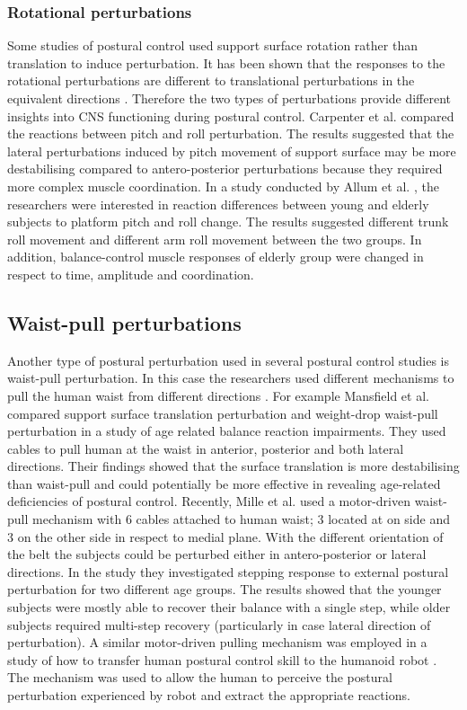 \documentclass[12pt,a4paper,twoside]{article}
\begin{document}
\subsubsection{{Rotational perturbations}}
Some studies of postural control used support surface rotation rather than translation to induce perturbation. It has been shown that the responses to the rotational perturbations are different to translational perturbations in the equivalent directions \cite{Nardone1990}. Therefore the two types of perturbations provide different insights into CNS functioning during postural control. Carpenter et al. \cite{Carpenter1999} compared the reactions between pitch and roll perturbation. The results suggested that the lateral perturbations induced by pitch movement of support surface may be more destabilising compared to antero-posterior perturbations because they required more complex muscle coordination. In a study conducted by Allum et al. \cite{Allum2002}, the researchers were interested in reaction differences between young and elderly subjects to platform pitch and roll change. The results suggested different trunk roll movement and different arm roll movement between the two groups. In addition, balance-control muscle responses of elderly group were changed in respect to time, amplitude and coordination.

\subsection{{Waist-pull perturbations}}
Another type of postural perturbation used in several postural control studies is waist-pull perturbation. In this case the researchers used different mechanisms to pull the human waist from different directions \cite{Luchies1994,Pidcoe1998}. For example Mansfield et al. \cite{Mansfield2009} compared support surface translation perturbation and weight-drop waist-pull perturbation in a study of age related balance reaction impairments. They used cables to pull human at the waist in anterior, posterior and both lateral directions. Their findings showed that the surface translation is more destabilising than waist-pull and could potentially be more effective in revealing age-related deficiencies of postural control. Recently, Mille et al. \cite{Mille2013a} used a motor-driven waist-pull mechanism with 6 cables attached to human waist; 3 located at on side and 3 on the other side in respect to medial plane. With the different orientation of the belt the subjects could be perturbed either in antero-posterior or lateral directions. In the study they investigated stepping response to external postural perturbation for two different age groups. The results showed that the younger subjects were mostly able to recover their balance with a single step, while older subjects required multi-step recovery (particularly in case lateral direction of perturbation). A similar motor-driven pulling mechanism \cite{Peternel2013a} was employed in a study of how to transfer human postural control skill to the humanoid robot \cite{Peternel2013b}. The mechanism was used to allow the human to perceive the postural perturbation experienced by robot and extract the appropriate reactions.
\end{document}

